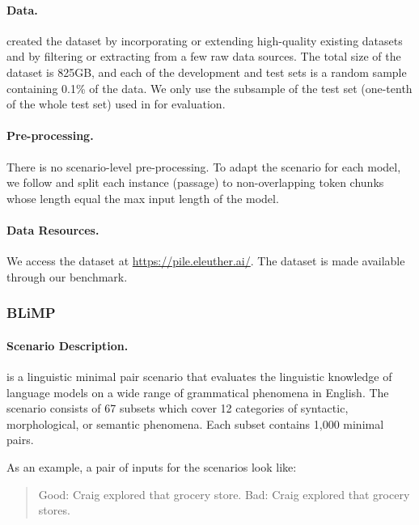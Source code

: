 \paragraph{Data.}
\citet{gao2021thepile} created the dataset by incorporating or extending high-quality existing datasets and by filtering or extracting from a few raw data sources. The total size of the dataset is 825GB, and each of the development and test sets is a random sample containing 0.1\% of the data. We only use the subsample of the test set (one-tenth of the whole test set) used in \citet{gao2021thepile} for evaluation.

\paragraph{Pre-processing.}
There is no scenario-level pre-processing. To adapt the scenario for each model, we follow \citep{gao2021thepile} and split each instance (passage) to non-overlapping token chunks whose length equal the max input length of the model.

\paragraph{Data Resources.}
We access the dataset at \url{https://pile.eleuther.ai/}.
The dataset is made available through our benchmark. 

\subsubsection{BLiMP}

\paragraph{Scenario Description.}

\blimp \citep{warstadt-etal-2020-blimp-benchmark} is a linguistic minimal pair scenario that evaluates the linguistic knowledge of language models on a wide range of grammatical phenomena in English. The scenario consists of 67 subsets which cover 12 categories of syntactic, morphological, or semantic phenomena. Each subset contains 1,000 minimal pairs.

As an example, a pair of inputs for the scenarios look like: 
\begin{quote}
Good: Craig explored that grocery store. 
Bad: Craig explored that grocery stores.
\end{quote}

